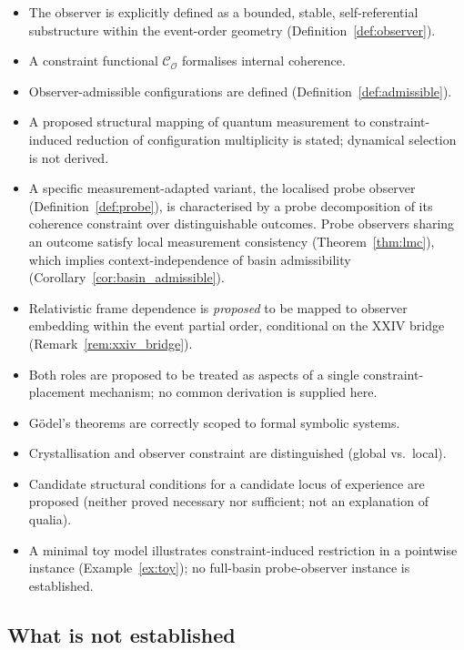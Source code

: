 \documentclass[12pt]{article}
\newcommand{\Ocal}{\mathcal{O}}
\newcommand{\Ccal}{\mathcal{C}}
\begin{document}
\begin{itemize}
    \item The observer is explicitly defined as a bounded, stable, self-referential substructure within the event-order geometry (Definition~\ref{def:observer}).
    \item A constraint functional $\Ccal_\Ocal$ formalises internal coherence.
    \item Observer-admissible configurations are defined (Definition~\ref{def:admissible}).
    \item A proposed structural mapping of quantum measurement to constraint-induced reduction of configuration multiplicity is stated; dynamical selection is not derived.
    \item A specific measurement-adapted variant, the localised probe observer (Definition~\ref{def:probe}), is characterised by a probe decomposition of its coherence constraint over distinguishable outcomes. Probe observers sharing an outcome satisfy local measurement consistency (Theorem~\ref{thm:lmc}), which implies context-independence of basin admissibility (Corollary~\ref{cor:basin_admissible}).
    \item Relativistic frame dependence is \emph{proposed} to be mapped to observer embedding within the event partial order, conditional on the XXIV bridge (Remark~\ref{rem:xxiv_bridge}).
    \item Both roles are proposed to be treated as aspects of a single constraint-placement mechanism; no common derivation is supplied here.
    \item G\"odel's theorems are correctly scoped to formal symbolic systems.
    \item Crystallisation and observer constraint are distinguished (global vs.\ local).
    \item Candidate structural conditions for a candidate locus of experience are proposed (neither proved necessary nor sufficient; not an explanation of qualia).
    \item A minimal toy model illustrates constraint-induced restriction in a pointwise instance (Example~\ref{ex:toy}); no full-basin probe-observer instance is established.
\end{itemize}

\subsection{What is not established}
\end{document}
